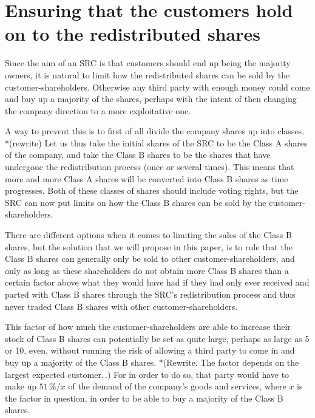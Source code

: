 \documentclass{article}
\begin{document}
\section{Ensuring that the customers hold on to the redistributed shares}


Since the aim of an SRC is that customers should end up being the majority owners, it is natural to limit how the redistributed shares can be sold by the customer-shareholders. Otherwise any third party with enough money could come and buy up a majority of the shares, perhaps with the intent of then changing the company direction to a more exploitative one.

A way to prevent this is to first of all divide the company shares up into classes. *(rewrite) Let us thus take the initial shares of the SRC to be the Class A shares of the company, and take the Class B shares to be the shares that have undergone the redistribution process (once or several times). This means that more and more Class A shares will be converted into Class B shares as time progresses. Both of these classes of shares should include voting rights, but the SRC can now put limits on how the Class B shares can be sold by the customer-shareholders. 

There are different options when it comes to limiting the sales of the Class B shares, but the solution that we will propose in this paper, is to rule that the Class B shares can generally only be sold to other customer-shareholders, and only as long as these shareholders do not obtain more Class B shares than a certain factor above what they would have had if they had 
only ever received and parted with Class B shares through the SRC's redistribution process and thus never traded Class B shares with other customer-shareholders. 

This factor of how much the customer-shareholders are able to increase their stock of Class B shares can potentially be set as quite large, perhaps as large as 5 or 10, even, without running the risk of allowing a third party to come in and buy up a majority of the Class B shares. *(Rewrite. The factor depends on the largest expected customer.\,.) For in order to do so, that party would have to make up $51\,\% / x$ of the demand of the company's goods and services, where $x$ is the factor in question, in order to be able to buy a majority of the Class B shares.
\end{document}
